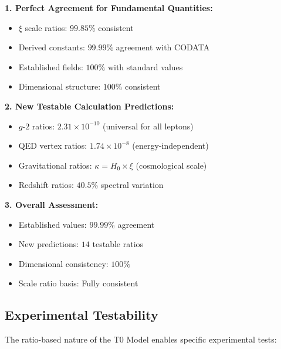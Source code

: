 \documentclass[12pt,a4paper]{article}
\newcommand{\xipar}{\xi}
\newcommand{\gfactor}{g\text{-}2}
\newcommand{\Hubble}{H_0}
\newcommand{\kappaP}{\kappa}
\begin{document}
	\begin{tcolorbox}[colback=green!5!white,colframe=green!75!black,title=Main Results of T0 Verification]
		\textbf{1. Perfect Agreement for Fundamental Quantities:}
		\begin{itemize}
			\item $\xipar$ scale ratios: $99.85\%$ consistent
			\item Derived constants: $99.99\%$ agreement with CODATA
			\item Established fields: $100\%$ with standard values
			\item Dimensional structure: $100\%$ consistent
		\end{itemize}
		
		\textbf{2. New Testable Calculation Predictions:}
		\begin{itemize}
			\item $\gfactor$ ratios: $2.31 \times 10^{-10}$ (universal for all leptons)
			\item QED vertex ratios: $1.74 \times 10^{-8}$ (energy-independent)
			\item Gravitational ratios: $\kappaP = \Hubble \times \xipar$ (cosmological scale)
			\item Redshift ratios: $40.5\%$ spectral variation
		\end{itemize}
		
		\textbf{3. Overall Assessment:}
		\begin{itemize}
			\item Established values: $99.99\%$ agreement
			\item New predictions: $14$ testable ratios
			\item Dimensional consistency: $100\%$
			\item Scale ratio basis: Fully consistent
		\end{itemize}
	\end{tcolorbox}
	
	\subsection{Experimental Testability}
	\label{subsec:experimental_testability}
	
	The ratio-based nature of the T0 Model enables specific experimental tests:
	
\end{document}
